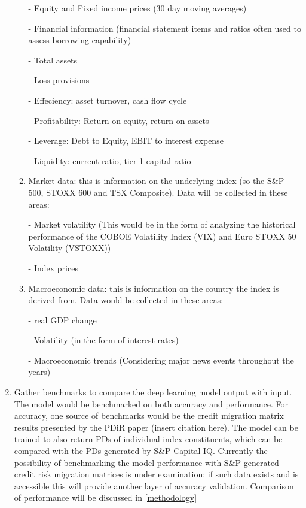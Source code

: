 \documentclass[10pt]{article}
\begin{document}
\begin{multicols*}{2}
\begin{enumerate}
\begin{enumerate}
			- Equity and Fixed income prices (30 day moving averages)

			- Financial information (financial statement items and ratios often used to assess borrowing capability)

				- Total assets

				- Loss provisions

				- Effeciency: asset turnover, cash flow cycle

				- Profitability: Return on equity, return on assets

				- Leverage: Debt to Equity, EBIT to interest expense

				- Liquidity: current ratio, tier 1 capital ratio

		\item Market data: this is information on the underlying index (so the S\&P 500, STOXX 600 and TSX Composite). Data will be collected in these areas:
		 
			- Market volatility (This would be in the form of analyzing the historical performance of the COBOE Volatility Index (VIX) and Euro STOXX 50 Volatility (VSTOXX))

			- Index prices

		\item Macroeconomic data: this is information on the country the index is derived from. Data would be collected in these areas:
	
			- real GDP change

			- Volatility (in the form of interest rates)

			- Macroeconomic trends (Considering major news events throughout the years)

	\end{enumerate} 
	\item Gather benchmarks to compare the deep learning model output with input. The model would be benchmarked on both accuracy and performance.
	For accuracy, one source of benchmarks would be the credit migration matrix results presented by the PDiR paper (insert citation here).
	The model can be trained to also return PDs of individual index constituents, which can be compared with the PDs generated by S\&P Capital IQ. 
	Currently the possibility of benchmarking the model performance with S\&P generated credit risk migration matrices is under examination; 
	if such data exists and is accessible this will provide another layer of accuracy validation. Comparison of performance will be discussed in \ref{methodology}
\end{enumerate}


\end{multicols*}
\end{document}
